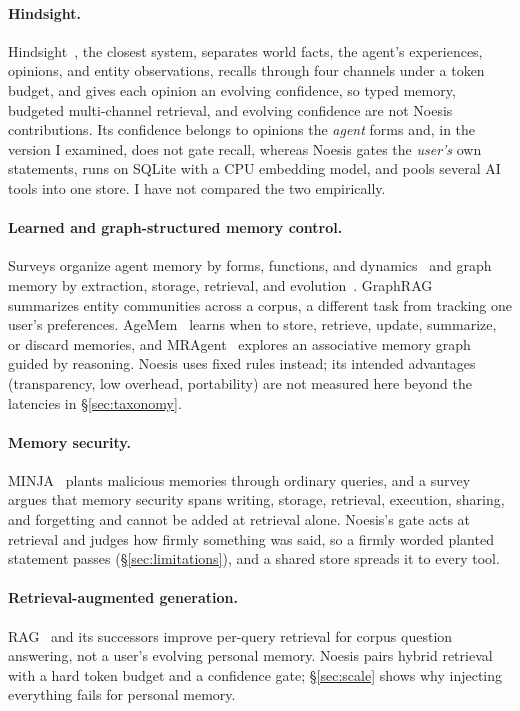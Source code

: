 \documentclass[11pt]{article}
\begin{document}
\paragraph{Hindsight.} Hindsight~\citep{hindsight}, the closest system,
separates world facts, the agent's experiences, opinions, and entity
observations, recalls through four channels under a token budget, and gives
each opinion an evolving confidence, so typed memory, budgeted multi-channel
retrieval, and evolving confidence are not Noesis contributions. Its
confidence belongs to opinions the \emph{agent} forms and, in the version I
examined, does not gate recall, whereas Noesis gates the \emph{user's} own
statements, runs on SQLite with a CPU embedding model, and pools several AI
tools into one store. I have not compared the two empirically.

\paragraph{Learned and graph-structured memory control.} Surveys organize
agent memory by forms, functions, and dynamics~\citep{hu2025memory} and graph
memory by extraction, storage, retrieval, and
evolution~\citep{yang2026graphmemory}. GraphRAG~\citep{graphrag} summarizes
entity communities across a corpus, a different task from tracking one user's
preferences. AgeMem~\citep{agemem} learns when to store, retrieve, update,
summarize, or discard memories, and MRAgent~\citep{mragent} explores an
associative memory graph guided by reasoning. Noesis uses fixed rules instead;
its intended advantages (transparency, low overhead, portability) are not
measured here beyond the latencies in \S\ref{sec:taxonomy}.

\paragraph{Memory security.} MINJA~\citep{minja} plants malicious memories
through ordinary queries, and a survey~\citep{lin2026memsecurity} argues that
memory security spans writing, storage, retrieval, execution, sharing, and
forgetting and cannot be added at retrieval alone. Noesis's gate acts at
retrieval and judges how firmly something was said, so a firmly worded planted
statement passes (\S\ref{sec:limitations}), and a shared store spreads it to
every tool.

\paragraph{Retrieval-augmented generation.} RAG~\citep{lewis2020rag} and its
successors improve per-query retrieval for corpus question answering, not a
user's evolving personal memory. Noesis pairs hybrid retrieval with a hard
token budget and a confidence gate; \S\ref{sec:scale} shows why injecting
everything fails for personal memory.
\end{document}
